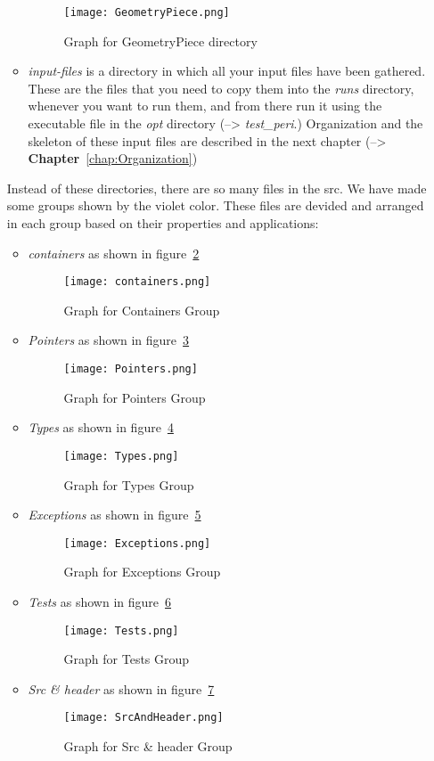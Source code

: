 \begin{itemize}
\begin{itemize}
\begin{figure}
  \texttt{[image: GeometryPiece.png]}
  \caption{Graph for GeometryPiece directory}
  \label{fig:GeometryPiece}
\end{figure}
 \item \emph{input-files} is a directory in which all your input files have been gathered. These are the files that you need to copy them into the \emph{runs} directory, whenever you want to run them, and from there run it using the executable file in the \emph{opt} directory (--> \emph{test\_peri}.) Organization and the skeleton of these input files are described in the next chapter (--> \textbf{Chapter}~\ref{chap:Organization})
 \end{itemize}
Instead of these directories, there are so many files in the src. We have made some groups shown by the violet color. These files are devided and arranged in each group based on their properties and applications:
\begin{itemize}
 \item \emph{containers} as shown in figure~\ref{fig:containers}
\begin{figure}
  \texttt{[image: containers.png]}
  \caption{Graph for Containers Group}
  \label{fig:containers}
\end{figure}
 \item \emph{Pointers} as shown in figure~\ref{fig:Pointers}
\begin{figure}
  \texttt{[image: Pointers.png]}
  \caption{Graph for Pointers Group}
  \label{fig:Pointers}
\end{figure}
 \item \emph{Types} as shown in figure~\ref{fig:Types}
\begin{figure}
  \texttt{[image: Types.png]}
  \caption{Graph for Types Group}
  \label{fig:Types}
\end{figure}
 \item \emph{Exceptions} as shown in figure~\ref{fig:Exceptions}
\begin{figure}
  \texttt{[image: Exceptions.png]}
  \caption{Graph for Exceptions Group}
  \label{fig:Exceptions}
\end{figure}
 \item \emph{Tests} as shown in figure~\ref{fig:Tests}
\begin{figure}
  \texttt{[image: Tests.png]}
  \caption{Graph for Tests Group}
  \label{fig:Tests}
\end{figure}
 \item \emph{Src \& header} as shown in figure~\ref{fig:SrcAndHeader}
\begin{figure}
  \texttt{[image: SrcAndHeader.png]}
  \caption{Graph for Src \& header Group}
  \label{fig:SrcAndHeader}
\end{figure}
 \end{itemize}
\end{itemize}







